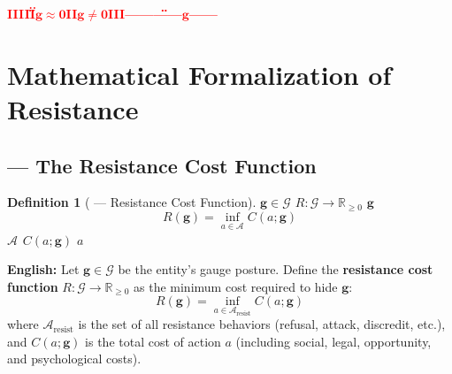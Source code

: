 \documentclass[12pt,a4paper]{article}
\newtheorem{definition}[theorem]{Definition}
\theoremstyle{remark}
\newcommand{\R}{\mathbb{R}}
\newcommand{\G}{\mathcal{G}}
\newcommand{\g}{\mathbf{g}}
\newcommand{\honestcrit}[1]{%
    \textcolor{red}{\textbf{#1}}%
}
\begin{document}
\honestcrit{IIIII\"\"$ \g\approx\mathbf{0} $II$ \g\neq\mathbf{0} $III——\"\"——$ \g $——}

\section{}
\section{Mathematical Formalization of Resistance}

\subsection{ — The Resistance Cost Function}

\begin{definition}[ — Resistance Cost Function]\label{def:Rg}
 $ \g \in \G $ \textbf{} $ R: \G \to \R_{\geq 0} $  $ \g $ 
\begin{equation}
    R(\g) = \inf_{a \in \mathcal{A}_{\text{}}} C(a; \g)
\end{equation}
 $ \mathcal{A}_{\text{}} $ $ C(a; \g) $  $ a $ 
\end{definition}

\vspace{4pt}
\noindent
\textbf{English:} Let $ \g \in \G $ be the entity's gauge posture. Define the \textbf{resistance cost function} $ R: \G \to \R_{\geq 0} $ as the minimum cost required to hide $ \g $:
\begin{equation}
    R(\g) = \inf_{a \in \mathcal{A}_{\text{resist}}} C(a; \g)
\end{equation}
where $ \mathcal{A}_{\text{resist}} $ is the set of all resistance behaviors (refusal, attack, discredit, etc.), and $ C(a; \g) $ is the total cost of action $ a $ (including social, legal, opportunity, and psychological costs).
\end{document}

